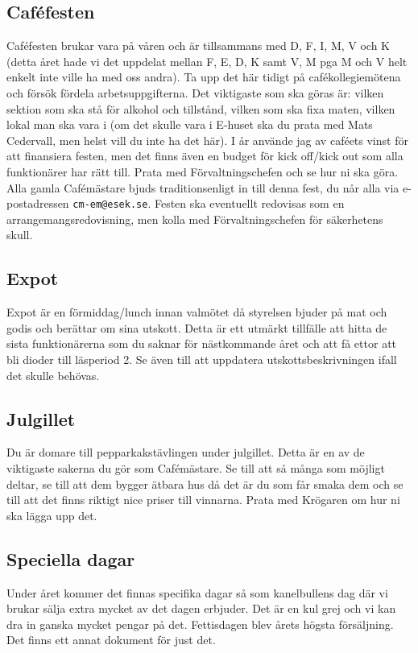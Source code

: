 \documentclass[10pt]{article}
\begin{document}
\subsection{Caféfesten}
Caféfesten brukar vara på våren och är tillsammans med D, F, I, M, V och K (detta året hade vi det uppdelat mellan F, E, D, K samt V, M pga M och V helt enkelt inte ville ha med oss andra). Ta upp det här tidigt på cafékollegiemötena och försök fördela arbetsuppgifterna. Det viktigaste som ska göras är: vilken sektion som ska stå för alkohol och tillstånd, vilken som ska fixa maten, vilken lokal man ska vara i (om det skulle vara i E-huset ska du prata med Mats Cedervall, men helst vill du inte ha det här). I år använde jag av caféets vinst för att finansiera festen, men det finns även en budget för kick off/kick out som alla funktionärer har rätt till. Prata med Förvaltningschefen och se hur ni ska göra. Alla gamla Cafémästare bjuds traditionsenligt in till denna fest, du når alla via e-postadressen \texttt{cm-em@esek.se}. Festen ska eventuellt redovisas som en arrangemangsredovisning, men kolla med Förvaltningschefen för säkerhetens skull.

\subsection{Expot}
Expot är en förmiddag/lunch innan valmötet då styrelsen bjuder på mat och godis och berättar om sina utskott. Detta är ett utmärkt tillfälle att hitta de sista funktionärerna som du saknar för nästkommande året och att få ettor att bli dioder till läsperiod 2. Se även till att uppdatera utskottsbeskrivningen ifall det skulle behövas.

\subsection{Julgillet}
Du är domare till pepparkakstävlingen under julgillet. Detta är en av de viktigaste sakerna du gör som Cafémästare. Se till att så många som möjligt deltar, se till att dem bygger ätbara hus då det är du som får smaka dem och se till att det finns riktigt nice priser till vinnarna. Prata med Krögaren om hur ni ska lägga upp det.

\subsection{Speciella dagar}
Under året kommer det finnas specifika dagar så som kanelbullens dag där vi brukar sälja extra mycket av det dagen erbjuder. Det är en kul grej och vi kan dra in ganska mycket pengar på det. Fettisdagen blev årets högsta försäljning. Det finns ett annat dokument för just det.
\end{document}
